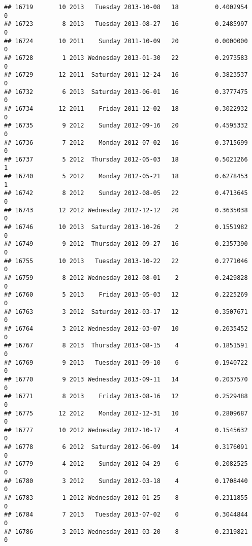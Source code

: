 \documentclass[
]{article}
\begin{document}
\begin{verbatim}
## 16719       10 2013   Tuesday 2013-10-08   18          0.4002954             0
## 16723        8 2013   Tuesday 2013-08-27   16          0.2485997             0
## 16724       10 2011    Sunday 2011-10-09   20          0.0000000             0
## 16728        1 2013 Wednesday 2013-01-30   22          0.2973583             0
## 16729       12 2011  Saturday 2011-12-24   16          0.3823537             0
## 16732        6 2013  Saturday 2013-06-01   16          0.3777475             0
## 16734       12 2011    Friday 2011-12-02   18          0.3022932             0
## 16735        9 2012    Sunday 2012-09-16   20          0.4595332             0
## 16736        7 2012    Monday 2012-07-02   16          0.3715699             0
## 16737        5 2012  Thursday 2012-05-03   18          0.5021266             1
## 16740        5 2012    Monday 2012-05-21   18          0.6278453             1
## 16742        8 2012    Sunday 2012-08-05   22          0.4713645             0
## 16743       12 2012 Wednesday 2012-12-12   20          0.3635038             0
## 16746       10 2013  Saturday 2013-10-26    2          0.1551982             0
## 16749        9 2012  Thursday 2012-09-27   16          0.2357390             0
## 16755       10 2013   Tuesday 2013-10-22   22          0.2771046             0
## 16759        8 2012 Wednesday 2012-08-01    2          0.2429828             0
## 16760        5 2013    Friday 2013-05-03   12          0.2225269             0
## 16763        3 2012  Saturday 2012-03-17   12          0.3507671             0
## 16764        3 2012 Wednesday 2012-03-07   10          0.2635452             0
## 16767        8 2013  Thursday 2013-08-15    4          0.1851591             0
## 16769        9 2013   Tuesday 2013-09-10    6          0.1940722             0
## 16770        9 2013 Wednesday 2013-09-11   14          0.2037570             0
## 16771        8 2013    Friday 2013-08-16   12          0.2529488             0
## 16775       12 2012    Monday 2012-12-31   10          0.2809687             0
## 16777       10 2012 Wednesday 2012-10-17    4          0.1545632             0
## 16778        6 2012  Saturday 2012-06-09   14          0.3176091             0
## 16779        4 2012    Sunday 2012-04-29    6          0.2082525             0
## 16780        3 2012    Sunday 2012-03-18    4          0.1708440             0
## 16783        1 2012 Wednesday 2012-01-25    8          0.2311855             0
## 16784        7 2013   Tuesday 2013-07-02    0          0.3044844             0
## 16786        3 2013 Wednesday 2013-03-20    8          0.2319821             0

\end{verbatim}
\end{document}
